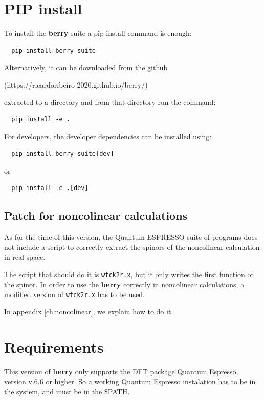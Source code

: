 \documentclass[a4paper,12pt]{report}
\begin{document}
\section{PIP install}

To install the \textbf{berry} suite a pip install command is enough:
\begin{verbatim}
  pip install berry-suite
\end{verbatim}

Alternatively, it can be downloaded from the github

(https://ricardoribeiro-2020.github.io/berry/)

extracted to a directory and from that directory run the command:
\begin{verbatim}
  pip install -e .
\end{verbatim}

For developers, the developer dependencies can be installed using:
\begin{verbatim}
  pip install berry-suite[dev]
\end{verbatim}
or
\begin{verbatim}
  pip install -e .[dev]
\end{verbatim}

\subsection{Patch for noncolinear calculations}

As for the time of this version, the {\sc Quantum ESPRESSO} suite of programs
does not include a script to correctly extract the spinors of the noncolinear calculation
in real space.

The script that should do it is \verb*|wfck2r.x|, but it only writes the first function of the spinor.
In order to use the \textbf{berry} correctly in noncolinear calculations,
a modified version of \verb*|wfck2r.x| has to be used.

In appendix \ref{ch:noncolinear}, we explain how to do it.



\section{Requirements}

This version of \textbf{berry} only supports the DFT package {\sc Quantum Espresso}, version v.6.6 or higher.
So a working {\sc Quantum Espresso} instalation has to be in the system, and must be in the \$PATH.
\end{document}
